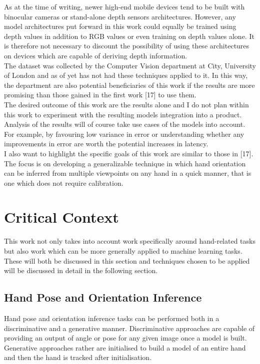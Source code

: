 \documentclass{article}
\begin{document}
As at the time of writing, newer high-end mobile devices tend to be built with binocular cameras or stand-alone depth sensors architectures. However, any model architectures put forward in this work could equally be trained using depth values in addition to RGB values or even training on depth values alone. It is therefore not necessary to discount the possibility of using these architectures on devices which are capable of deriving depth information. \\

The dataset was collected by the Computer Vision department at City, University of London and as of yet has not had these techniques applied to it. In this way, the department are also potential beneficiaries of this work if the results are more promising than those gained in the first work [17] to use them.\\

The desired outcome of this work are the results alone and I do not plan within this work to experiment with the resulting models integration into a product. Analysis of the results will of course take use cases of the models into account. For example, by favouring low variance in error or understanding whether any improvements in error are worth the potential increases in latency.  \\

I also want to highlight the specific goals of this work are similar to those in [17]. The focus is on developing a generalizable technique in which hand orientation can be inferred from multiple viewpoints on any hand in a quick manner, that is one which does not require calibration.\\

\section{Critical Context}
This work not only takes into account work specifically around hand-related tasks but also work which can be more generally applied to machine learning tasks. These will both be discussed in this section and techniques chosen to be applied will be discussed in detail in the following section.   

\subsection{Hand Pose and Orientation Inference}
Hand pose and orientation inference tasks can be performed both in a discriminative and a generative manner. Discriminative approaches are capable of providing an output of angle or pose for any given image once a model is built. Generative approaches rather are initialised to build a model of an entire hand and then the hand is tracked after initialisation.\\
\end{document}
